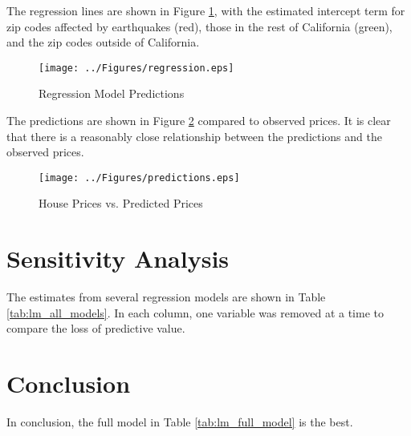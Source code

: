 \documentclass{paper}
\begin{document}
\pagebreak
The regression lines are shown in Figure \ref{fig:reg}, with the estimated intercept term for zip codes affected by earthquakes (red), those in the rest of California (green), and the zip codes outside of California.

\begin{figure}
\centering
\texttt{[image: ../Figures/regression.eps]}
\caption{Regression Model Predictions}
\label{fig:reg}
\end{figure}


\pagebreak
The predictions are shown in Figure \ref{fig:pred} compared to observed prices.
It is clear that there is a reasonably close relationship between the predictions and the observed prices.

\begin{figure}
\centering
\texttt{[image: ../Figures/predictions.eps]}
\caption{House Prices vs. Predicted Prices}
\label{fig:pred}
\end{figure}



\pagebreak
\section{Sensitivity Analysis}  \label{sec:sensitivity}


The estimates from several regression models are shown in Table \ref{tab:lm_all_models}. 
In each column, one variable was removed at a time
to compare the loss of predictive value.  



\pagebreak
\section{Conclusion}  \label{sec:conc}

In conclusion, the full model in Table \ref{tab:lm_full_model} is the best.


\end{document}
